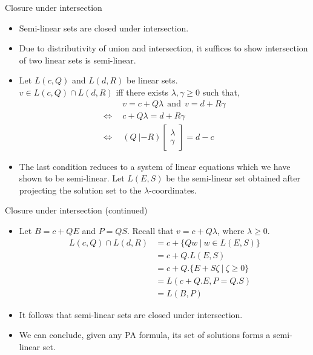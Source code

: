 \documentclass[10pt]{beamer}
\begin{document}
\begin{frame}{Closure under intersection}
    \begin{itemize}
    \item Semi-linear sets are closed under intersection.
    \item Due to distributivity of union and intersection, it suffices to show intersection
    of two linear sets is semi-linear.
    \item Let $L(c,Q)$ and $L(d,R)$ be linear sets. \\
    $v\in L(c,Q)\cap L(d,R)$ iff there exists $\lambda,\gamma\geq 0$ such that, 
    \begin{align*}
        &v=c+Q\lambda\: \:\text{and}\:\:v=d+R\gamma\\
      \Leftrightarrow\:\:&c+Q\lambda=d+R\gamma\\
      \Leftrightarrow\:\:&(Q\:|-R)\begin{bmatrix}\lambda \\ \gamma \end{bmatrix}= d-c
    \end{align*}
    \item The last condition reduces to a system of linear equations which we have shown to be semi-linear.
    Let $L(E,S)$ be the semi-linear set obtained after projecting the solution set to the $\lambda$-coordinates.
\end{itemize}
\end{frame}
\begin{frame}{Closure under intersection (continued)}
    \begin{itemize}
        \item Let $B= c+ QE$ and $P=QS$. Recall that $v= c+Q\lambda$, where $\lambda\geq 0$.
        \begin{align*}
            L(c,Q)\cap L(d,R) &= c+\{Qw\:|\:w\in L(E,S)\}\\
            &=c+Q.L(E,S)\\
            &=c+Q.\{E+S\zeta\:|\:\zeta\geq 0\}\\
            &=L(c+ Q.E,P=Q.S)\\
            &=L(B,P)
        \end{align*}
        \item It follows that semi-linear sets are closed under intersection.
        \item We can conclude, given any PA formula, its set of solutions forms a semi-linear set.
    \end{itemize}
\end{frame}
\end{document}
